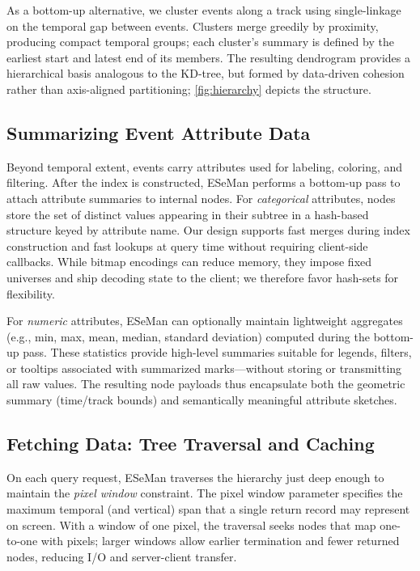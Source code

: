\begin{refsection}
As a bottom-up alternative, we cluster events along a track using single-linkage on the temporal gap between events. Clusters merge greedily by proximity, producing compact temporal groups; each cluster's summary is defined by the earliest start and latest end of its members. The resulting dendrogram provides a hierarchical basis analogous to the KD-tree, but formed by data-driven cohesion rather than axis-aligned partitioning; \autoref{fig:hierarchy} depicts the structure.

\subsection{Summarizing Event Attribute Data}
\label{subsec:attributes}

Beyond temporal extent, events carry attributes used for labeling, coloring, and filtering. After the index is constructed, ESeMan performs a bottom-up pass to attach attribute summaries to internal nodes. For \emph{categorical} attributes, nodes store the set of distinct values appearing in their subtree in a hash-based structure keyed by attribute name. Our design supports fast merges during index construction and fast lookups at query time without requiring client-side callbacks. While bitmap encodings can reduce memory, they impose fixed universes and ship decoding state to the client; we therefore favor hash-sets for flexibility.

For \emph{numeric} attributes, ESeMan can optionally maintain lightweight aggregates (e.g., min, max, mean, median, standard deviation) computed during the bottom-up pass. These statistics provide high-level summaries suitable for legends, filters, or tooltips associated with summarized marks—without storing or transmitting all raw values. The resulting node payloads thus encapsulate both the geometric summary (time/track bounds) and semantically meaningful attribute sketches.

\subsection{Fetching Data: Tree Traversal and Caching}
\label{subsec:caching}

On each query request, ESeMan traverses the hierarchy just deep enough to maintain the \emph{pixel window} constraint. The pixel window parameter specifies the maximum temporal (and vertical) span that a single return record may represent on screen. With a window of one pixel, the traversal seeks nodes that map one-to-one with pixels; larger windows allow earlier termination and fewer returned nodes, reducing I/O and server-client transfer.


\end{refsection}
